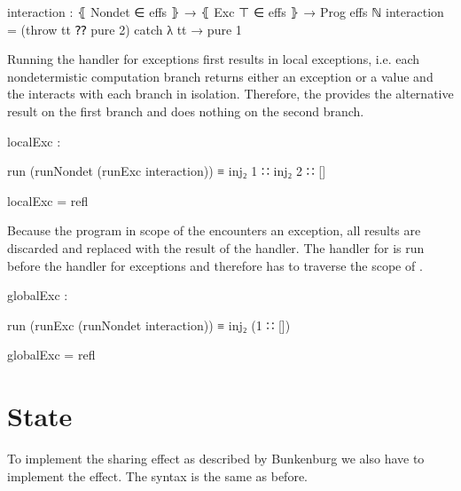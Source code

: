 \begin{code}
interaction : ⦃ Nondet ∈ effs ⦄ → ⦃ Exc ⊤ ∈ effs ⦄ → Prog effs ℕ
interaction = (throw tt ⁇ pure 2) catch λ tt → pure 1
\end{code}
Running the handler for exceptions first results in local exceptions, i.e. each
nondetermistic computation branch returns either an exception or a value and
the  interacts with each branch in isolation.
Therefore, the  provides the alternative result
 on the first branch and does nothing on the second branch.

\begin{center}
\begin{code}
localExc :
\end{code}
\begin{code}[inline]
 run (runNondet (runExc interaction)) ≡ inj₂ 1 ∷ inj₂ 2 ∷ []
\end{code}
\begin{code}
localExc = refl
\end{code}
\end{center}
Because the program in scope of the  encounters an
exception, all results are discarded and replaced with the result of the handler.
The handler for  is run before the handler for exceptions
and therefore has to traverse the scope of .

\begin{center}
\begin{code}
globalExc :
\end{code}
\begin{code}[inline]
 run (runExc (runNondet interaction)) ≡ inj₂ (1 ∷ [])
\end{code}
\begin{code}
globalExc = refl
\end{code}
\end{center}

\begin{code}
\end{code}

\section{State}
\label{scoped-algebra:state}

To implement the sharing effect as described by Bunkenburg we also have to
implement the  effect.
The syntax is the same as before.

